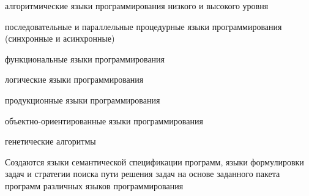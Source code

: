 \begin{scnsubstruct}
{\begin{scnitemize}
{\begin{scnitemizeii}
                \item{алгоритмические языки программирования низкого и высокого уровня}
                \item{последовательные и параллельные процедурные языки программирования (синхронные и асинхронные)}
                \item{функциональные языки программирования}
                \item{логические языки программирования}
                \item{продукционные языки программирования}
                \item{объектно-ориентированные языки программирования}
                \item{генетические алгоритмы}
            \end{scnitemizeii}
        }
        \item{Создаются языки семантической спецификации программ, языки формулировки задач и стратегии поиска
            пути решения задач на основе заданного пакета программ различных языков программирования}
    \end{scnitemize}
    }
\end{scnsubstruct}